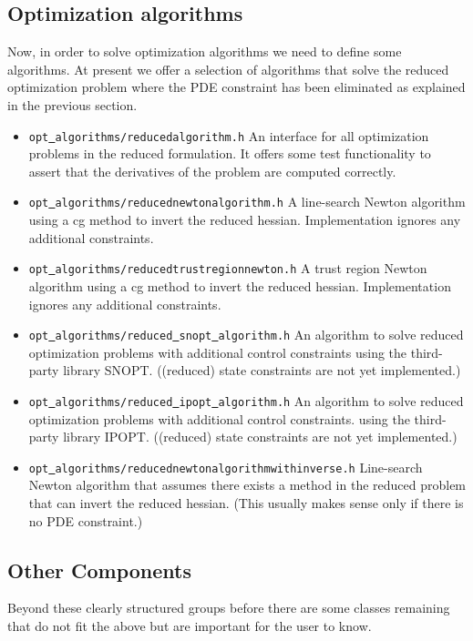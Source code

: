 \subsection{Optimization algorithms}
Now, in order to solve optimization algorithms we need to define some algorithms.
At present we offer a selection of algorithms that solve the reduced optimization 
problem where the PDE constraint has been eliminated as explained in the previous section.
\begin{itemize}
\item \texttt{opt\underline{ }algorithms/reducedalgorithm.h} An interface for all 
  optimization problems in the reduced formulation. It offers some test functionality
  to assert that the derivatives of the problem are computed correctly.
\item \texttt{opt\underline{ }algorithms/reducednewtonalgorithm.h}
  A line-search Newton algorithm using a cg method to invert the reduced hessian. 
  Implementation ignores any additional constraints.
\item \texttt{opt\underline{ }algorithms/reducedtrustregionnewton.h}
  A trust region Newton algorithm using a cg method to invert the reduced hessian.
  Implementation ignores any additional constraints.
\item \texttt{opt\underline{ }algorithms/reduced\underline{ }snopt\underline{ }algorithm.h}
  An algorithm to solve reduced optimization problems with additional control constraints
  using the third-party library SNOPT.
  ((reduced) state constraints are not yet implemented.)
\item \texttt{opt\underline{ }algorithms/reduced\underline{ }ipopt\underline{ }algorithm.h}
  An algorithm to solve reduced optimization problems with additional control constraints.
  using the third-party library IPOPT.
  ((reduced) state constraints are not yet implemented.)
\item \texttt{opt\underline{ }algorithms/reducednewtonalgorithmwithinverse.h}
  Line-search Newton algorithm that assumes there exists a method in the reduced problem
  that can invert the reduced hessian. (This usually makes sense only if there is no 
  PDE constraint.)
\end{itemize} 

\subsection{Other Components}
Beyond these clearly structured groups before there are some classes remaining that
do not fit the above but are important for the user to know.

